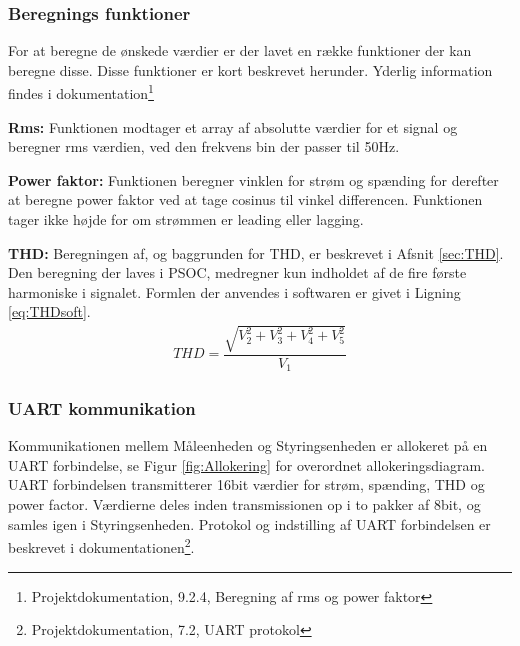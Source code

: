 
\subsubsection{Beregnings funktioner}
For at beregne de ønskede værdier er der lavet en række funktioner der kan beregne disse. Disse funktioner er kort beskrevet herunder. Yderlig information findes i dokumentation\footnote{Projektdokumentation, 9.2.4, Beregning af rms og power faktor}

\textbf{Rms:}
Funktionen modtager et array af absolutte værdier for et signal og beregner rms værdien, ved den frekvens bin der passer til 50Hz.

\textbf{Power faktor:}
Funktionen beregner vinklen for strøm og spænding for derefter at beregne power faktor ved at tage cosinus til vinkel differencen. Funktionen tager ikke højde for om strømmen er leading eller lagging.

\textbf{THD:}
Beregningen af, og baggrunden for THD, er beskrevet i Afsnit \ref{sec:THD}. Den beregning der laves i PSOC, medregner kun indholdet af de fire første harmoniske i signalet. Formlen der anvendes i softwaren er givet i Ligning \ref{eq:THDsoft}.
\begin{align}
\label{eq:THDsoft}
THD = \dfrac{\sqrt{V_2^{2}+V_3^{2}+V_4^{2}+V_5^{2}}}{V_{1}}
\end{align}
 

\subsubsection{UART kommunikation}
Kommunikationen mellem Måleenheden og Styringsenheden er allokeret på en UART forbindelse, se Figur \ref{fig:Allokering} for overordnet allokeringsdiagram. UART forbindelsen transmitterer 16bit værdier for strøm, spænding, THD og power factor. Værdierne deles inden transmissionen op i to pakker af 8bit, og samles igen i Styringsenheden. Protokol og indstilling af UART forbindelsen er beskrevet i dokumentationen\footnote{Projektdokumentation, 7.2, UART protokol}.




